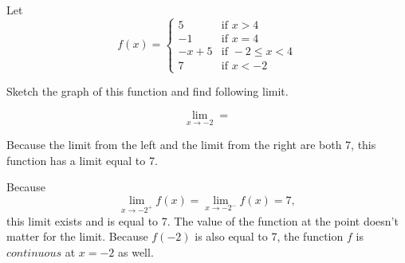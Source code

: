 \documentclass{ximera}
\author{Emma Smith Zbarsky}
\begin{document}
\begin{exercise}

Let
\[f(x) = \begin{cases} 5 & \mbox{if } x>4 \\ -1 & \mbox{if } x=4 \\ -x+5 & \mbox{if } -2\leq x < 4 \\ 7 & \mbox{if } x<-2 \end{cases}\]

Sketch the graph of this function and find following limit.

\[\lim_{x \to -2} = \]


\begin{hint}
Because the limit from the left and the limit from the right are both 7,
this function has a limit equal to 7.
\end{hint}


\begin{hint}
Because \[\lim_{x\to -2^+} f(x) = \lim_{x\to -2^-} f(x) = 7,\] this
limit exists and is equal to 7. The value of the function at the point
doesn't matter for the limit. Because $f(-2)$ is also equal to 7, the
function $f$ is ${continuous}$ at $x=-2$ as well.
\end{hint}


\begin{multipleChoice}
\end{multipleChoice}

\end{exercise}
\end{document}
